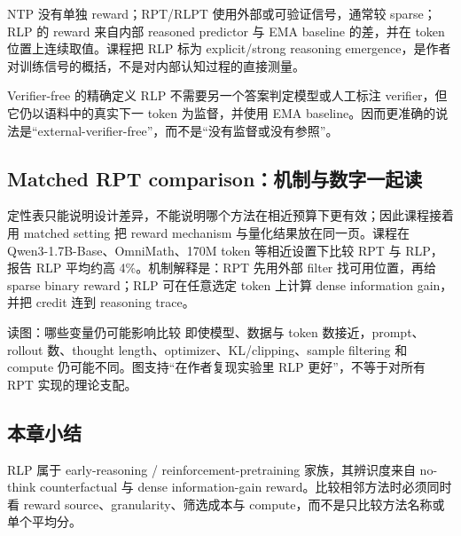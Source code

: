 NTP 没有单独 reward；RPT/RLPT 使用外部或可验证信号，通常较 sparse；RLP 的 reward 来自内部 reasoned predictor 与 EMA baseline 的差，并在 token 位置上连续取值。课程把 RLP 标为 explicit/strong reasoning emergence，是作者对训练信号的概括，不是对内部认知过程的直接测量。


\begin{warningbox}{Verifier-free 的精确定义}
RLP 不需要另一个答案判定模型或人工标注 verifier，但它仍以语料中的真实下一 token 为监督，并使用 EMA baseline。因而更准确的说法是“external-verifier-free”，而不是“没有监督或没有参照”。
\end{warningbox}

\subsection{Matched RPT comparison：机制与数字一起读}

定性表只能说明设计差异，不能说明哪个方法在相近预算下更有效；因此课程接着用 matched setting 把 reward mechanism 与量化结果放在同一页。课程在 Qwen3-1.7B-Base、OmniMath、170M token 等相近设置下比较 RPT 与 RLP，报告 RLP 平均约高 4\%。机制解释是：RPT 先用外部 filter 找可用位置，再给 sparse binary reward；RLP 可在任意选定 token 上计算 dense information gain，并把 credit 连到 reasoning trace。


\begin{knowledgebox}{读图：哪些变量仍可能影响比较}
即使模型、数据与 token 数接近，prompt、rollout 数、thought length、optimizer、KL/clipping、sample filtering 和 compute 仍可能不同。图支持“在作者复现实验里 RLP 更好”，不等于对所有 RPT 实现的理论支配。
\end{knowledgebox}

\subsection{本章小结}

RLP 属于 early-reasoning / reinforcement-pretraining 家族，其辨识度来自 no-think counterfactual 与 dense information-gain reward。比较相邻方法时必须同时看 reward source、granularity、筛选成本与 compute，而不是只比较方法名称或单个平均分。

